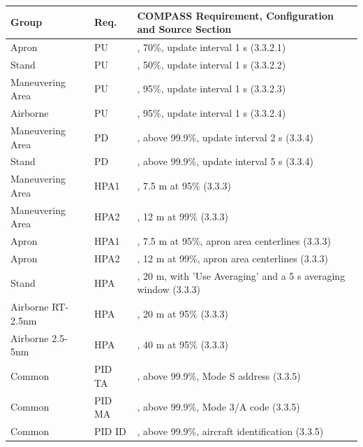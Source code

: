 \begin{center}
 \begin{table}[H]
  \begin{tabularx}{\textwidth}{ | l | l | X | }
    \hline
    \textbf{Group} & \textbf{Req.} & \textbf{COMPASS Requirement, Configuration and Source Section} \\ \hline
    Apron & PU & \nameref{sec:eval_req_detection}, 70\%, update interval 1 s (3.3.2.1) \\ \hline
    Stand & PU & \nameref{sec:eval_req_detection}, 50\%, update interval 1 s (3.3.2.2) \\ \hline
    Maneuvering Area & PU & \nameref{sec:eval_req_detection}, 95\%, update interval 1 s (3.3.2.3) \\ \hline
    Airborne & PU & \nameref{sec:eval_req_detection}, 95\%, update interval 1 s (3.3.2.4) \\ \hline
    Maneuvering Area & PD & \nameref{sec:eval_req_detection}, above 99.9\%, update interval 2 s (3.3.4) \\ \hline
    Stand & PD & \nameref{sec:eval_req_detection}, above 99.9\%, update interval 5 s (3.3.4) \\ \hline
    Maneuvering Area & HPA1 & \nameref{sec:eval_req_pos_distance}, 7.5 m at 95\% (3.3.3) \\ \hline
    Maneuvering Area & HPA2 & \nameref{sec:eval_req_pos_distance}, 12 m at 99\% (3.3.3) \\ \hline
    Apron & HPA1 & \nameref{sec:eval_req_pos_distance}, 7.5 m at 95\%, apron area centerlines (3.3.3) \\ \hline
    Apron & HPA2 & \nameref{sec:eval_req_pos_distance}, 12 m at 99\%, apron area centerlines (3.3.3) \\ \hline
    Stand & HPA & \nameref{sec:eval_req_pos_distance}, 20 m, with 'Use Averaging' and a 5 s averaging window (3.3.3) \\ \hline
    Airborne RT-2.5nm & HPA & \nameref{sec:eval_req_pos_distance}, 20 m at 95\% (3.3.3) \\ \hline
    Airborne 2.5-5nm & HPA & \nameref{sec:eval_req_pos_distance}, 40 m at 95\% (3.3.3) \\ \hline
    Common & PID TA & \nameref{sec:eval_req_id_correct}, above 99.9\%, Mode S address (3.3.5) \\ \hline
    Common & PID MA & \nameref{sec:eval_req_id_correct}, above 99.9\%, Mode 3/A code (3.3.5) \\ \hline
    Common & PID ID & \nameref{sec:eval_req_id_correct}, above 99.9\%, aircraft identification (3.3.5) \\ \hline

\end{tabularx}
\end{table}
\end{center}
